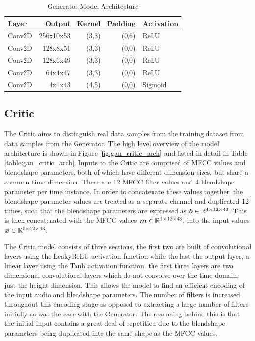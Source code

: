 \begin{table}[h!]
\centering
    \begin{tabular}{ l | r | r | r | l}
    \textbf{Layer} & \textbf{Output} & \textbf{Kernel} & \textbf{Padding} & \textbf{Activation} \\ \hline
    Conv2D & 256x10x53 & (3,3) & (0,6) & ReLU    \\ \hline
    Conv2D & 128x8x51  & (3,3) & (0,0) & ReLU    \\ \hline
    Conv2D & 128x6x49  & (3,3) & (0,0) & ReLU    \\ \hline
    Conv2D & 64x4x47   & (3,3) & (0,0) & ReLU    \\ \hline
    Conv2D & 4x1x43    & (4,5) & (0,0) & Sigmoid 
    \end{tabular} 
    \caption{Generator Model Architecture}\label{table:gan_gen_arch}
\end{table}

\subsection{Critic}
The Critic aims to distinguish real data samples from the training dataset from data samples from the Generator.
The high level overview of the model architecture is shown in Figure \ref{fig:gan_critic_arch} and listed in detail in Table \ref{table:gan_critic_arch}.
Inputs to the Critic are comprised of MFCC values and blendshape parameters, both of which have different dimension sizes, but share a common time dimension. 
There are 12 MFCC filter values and 4 blendshape parameter per time instance.
In order to concatenate these values together, the blendshape parameter values are treated as a separate channel and duplicated 12 times, such that the blendshape parameters are expressed as ${\boldsymbol{{b}}} \in \mathbb{R}^{4 \times 12 \times 43}$.
This is then concatenated with the MFCC values ${\boldsymbol{{m}}} \in \mathbb{R}^{1 \times 12 \times 43}$, into the input values ${\boldsymbol{{x}}} \in \mathbb{R}^{5 \times 12 \times 43}$.

The Critic model consists of three sections, the first two are built of convolutional layers using the LeakyReLU activation function while the last the output layer, a linear layer using the Tanh activation function.
the first three layers are two dimensional convolutional layers which do not convolve over the time domain, just the height dimension.
This allows the model to find an efficient encoding of the input audio and blendshape parameters.
The number of filters is increased throughout this encoding stage as opposed to extracting a large number of filters initially as was the case with the Generator.
The reasoning behind this is that the initial input contains a great deal of repetition due to the blendshape parameters being duplicated into the same shape as the MFCC values.

